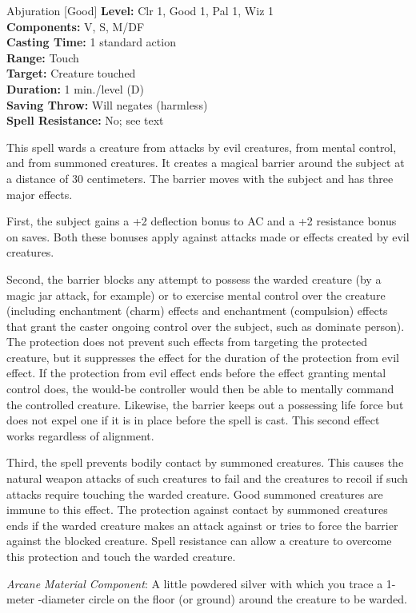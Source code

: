 {Abjuration [Good]}
{
	\textbf{Level:}
	Clr 1, Good 1, Pal 1, Wiz 1\\
	\textbf{Components:}
	V, S, M/DF\\
	\textbf{Casting Time:}
	1 standard action\\
	\textbf{Range:}
	Touch\\
	\textbf{Target:}
	Creature touched\\
	\textbf{Duration:}
	1 min./level (D)\\
	\textbf{Saving Throw:}
	Will negates (harmless)\\
	\textbf{Spell Resistance:}
	No; see text\\
}
{
	This spell wards a creature from attacks by evil creatures, from mental control, and from summoned creatures. It creates a magical barrier around the subject at a distance of 30 centimeters. The barrier moves with the subject and has three major effects.

	First, the subject gains a +2 deflection bonus to AC and a +2 resistance bonus on saves. Both these bonuses apply against attacks made or effects created by evil creatures.

	Second, the barrier blocks any attempt to possess the warded creature (by a magic jar attack, for example) or to exercise mental control over the creature (including enchantment (charm) effects and enchantment (compulsion) effects that grant the caster ongoing control over the subject, such as dominate person). The protection does not prevent such effects from targeting the protected creature, but it suppresses the effect for the duration of the protection from evil effect. If the protection from evil effect ends before the effect granting mental control does, the would-be controller would then be able to mentally command the controlled creature. Likewise, the barrier keeps out a possessing life force but does not expel one if it is in place before the spell is cast. This second effect works regardless of alignment.

	Third, the spell prevents bodily contact by summoned creatures. This causes the natural weapon attacks of such creatures to fail and the creatures to recoil if such attacks require touching the warded creature. Good summoned creatures are immune to this effect. The protection against contact by summoned creatures ends if the warded creature makes an attack against or tries to force the barrier against the blocked creature. Spell resistance can allow a creature to overcome this protection and touch the warded creature.

	\textit{Arcane Material Component}:
	A little powdered silver with which you trace a 1-meter -diameter circle on the floor (or ground) around the creature to be warded.

}
